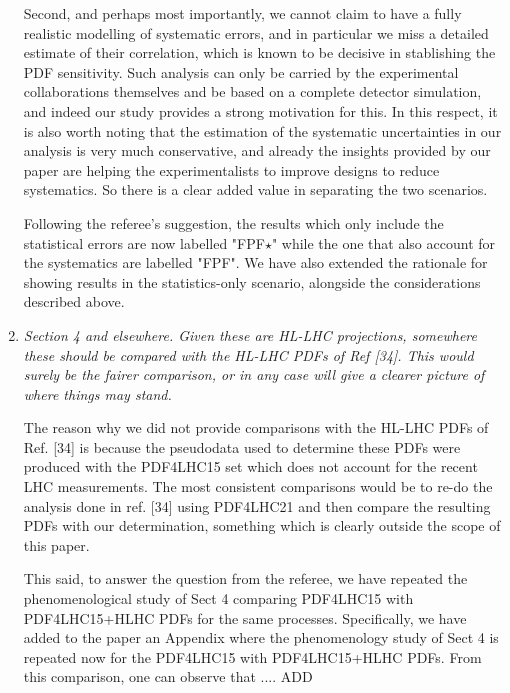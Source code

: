 \documentclass[11pt,a4paper]{article}
\begin{document}
\begin{enumerate}
        Second, and perhaps most importantly, we cannot claim to have a fully realistic modelling
        of systematic errors, and in particular we miss a detailed estimate of their correlation, which
        is known to be decisive in stablishing the PDF sensitivity.
        Such analysis can only be carried by the experimental collaborations themselves and
        be based on a complete detector simulation, and indeed our study provides
        a strong motivation for this.
        In this respect,  it is also worth noting that the estimation of the systematic uncertainties in our 
	analysis is very  much conservative, and already the insights provided by our paper
        are helping the experimentalists to improve designs to reduce systematics.
        So there is a clear added value in separating the two scenarios.
        	
	Following the referee's suggestion, the results which only include the statistical errors
	are now labelled "FPF$\star$" while the one that also account for the systematics are labelled "FPF".
        We have also extended the rationale for showing results in the statistics-only scenario, alongside the
        considerations described above.
	
	\item {\it Section 4 and elsewhere. Given these are HL-LHC projections, somewhere these should
		be compared with the HL-LHC PDFs of Ref [34]. This would surely be the fairer
		comparison, or in any case will give a clearer picture of where things may stand.
	}
	
	The reason why we did not provide comparisons with the HL-LHC PDFs of Ref. [34] is because
	the pseudodata used to determine these PDFs were produced with the PDF4LHC15 set which
	does not account for the recent LHC measurements. The most consistent comparisons would
	be to re-do the analysis done in ref. [34] using PDF4LHC21 and then compare the resulting PDFs 
	with our determination, something which is clearly outside the scope of this paper.

        This said, to answer the question from the referee, we have repeated the phenomenological study of Sect 4
        comparing PDF4LHC15 with PDF4LHC15+HLHC PDFs for the same processes.
        Specifically, we have added to the paper an Appendix where the phenomenology study of Sect 4 is repeated
        now for the PDF4LHC15 with PDF4LHC15+HLHC PDFs.
        From this comparison, one can observe that .... ADD


\end{enumerate}
\end{document}
